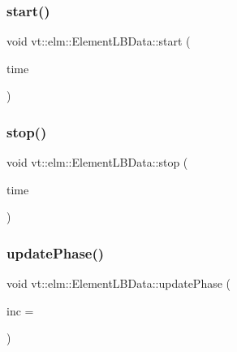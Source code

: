 \mbox{\label{structvt_1_1elm_1_1_element_l_b_data_a19e990ccbc5b1090e8d8385e19af760a}} 
\subsubsection{\texorpdfstring{start()}{start()}}
{\footnotesize\ttfamily void vt\+::elm\+::\+Element\+L\+B\+Data\+::start (\begin{DoxyParamCaption}\item[{\hyperlink{namespacevt_a2b9f28078dc309ad0706b69ded743e69}{Time\+Type}}]{time }\end{DoxyParamCaption})}

\mbox{\label{structvt_1_1elm_1_1_element_l_b_data_a96ccd1c4f6ec13365ca9d483eab8944c}} 
\subsubsection{\texorpdfstring{stop()}{stop()}}
{\footnotesize\ttfamily void vt\+::elm\+::\+Element\+L\+B\+Data\+::stop (\begin{DoxyParamCaption}\item[{\hyperlink{namespacevt_a2b9f28078dc309ad0706b69ded743e69}{Time\+Type}}]{time }\end{DoxyParamCaption})}

\mbox{\label{structvt_1_1elm_1_1_element_l_b_data_acb64ab9bcd98f12bd5cae08ebbefd943}} 
\subsubsection{\texorpdfstring{update\+Phase()}{updatePhase()}}
{\footnotesize\ttfamily void vt\+::elm\+::\+Element\+L\+B\+Data\+::update\+Phase (\begin{DoxyParamCaption}\item[{\hyperlink{namespacevt_a46ce6733d5cdbd735d561b7b4029f6d7}{Phase\+Type} const \&}]{inc = {} }\end{DoxyParamCaption})}



